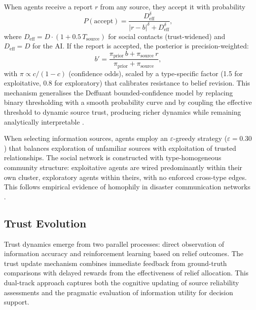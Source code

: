 \documentclass[pdflatex,sn-apa]{sn-jnl}%
\begin{document}
When agents receive a report $r$ from any source, they accept it with probability
%
\begin{equation}
  P(\text{accept}) = \frac{D_{\mathrm{eff}}^{\delta}}
                          {|r-b|^{\delta}+D_{\mathrm{eff}}^{\delta}},
  \label{eq:acceptance}
\end{equation}
%
where $D_{\mathrm{eff}} = D\cdot(1+0.5\,T_{\mathrm{source}})$ for social contacts
(trust-widened) and $D_{\mathrm{eff}}=D$ for the AI.
If the report is accepted, the posterior is precision-weighted:
%
\begin{equation}
  b' = \frac{\pi_{\mathrm{prior}}\,b + \pi_{\mathrm{source}}\,r}
            {\pi_{\mathrm{prior}} + \pi_{\mathrm{source}}},
  \label{eq:bayesian}
\end{equation}
%
with $\pi\propto c/(1-c)$ (confidence odds), scaled by a type-specific factor
(1.5 for exploitative, 0.8 for exploratory) that calibrates resistance to belief
revision.
This mechanism generalises the Deffuant bounded-confidence model
\citep{deffuant2000mixing} by replacing binary thresholding with a smooth
probability curve and by coupling the effective threshold to dynamic source trust,
producing richer dynamics while remaining analytically interpretable
\citep{lorenz2017continuous}.

When selecting information sources, agents employ an $\varepsilon$-greedy strategy
($\varepsilon=0.30$) that balances exploration of unfamiliar sources with
exploitation of trusted relationships.
The social network is constructed with type-homogeneous community structure:
exploitative agents are wired predominantly within their own cluster, exploratory
agents within theirs, with no enforced cross-type edges.
This follows empirical evidence of homophily in disaster communication networks
\citep{Bruns2012,Sutton2008}.

\subsection{Trust Evolution}

Trust dynamics emerge from two parallel processes: direct observation of
information accuracy and reinforcement learning based on relief outcomes.
The trust update mechanism combines immediate feedback from ground-truth comparisons
with delayed rewards from the effectiveness of relief allocation.
This dual-track approach captures both the cognitive updating of source reliability
assessments and the pragmatic evaluation of information utility for decision support.
\end{document}
